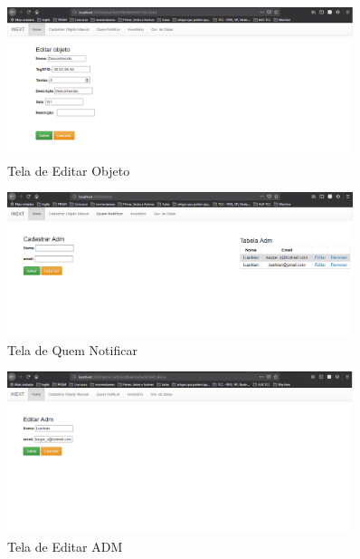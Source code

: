     \begin{figure}[H]
              \caption{\label{fig:tela_cadastro_manual}Tela de Editar Objeto}
              \centering
              \includegraphics[width=0.9\textwidth]{Figuras/tela_editar.png}
    \end{figure}
    
     \begin{figure}[H]
              \caption{\label{fig:tela_cadastro_manual}Tela de Quem Notificar}
              \centering
              \includegraphics[width=0.9\textwidth]{Figuras/tela_quem_notificar.PNG}
    \end{figure}
    
    \begin{figure}[H]
              \caption{\label{fig:tela_cadastro_manual}Tela de Editar ADM}
              \centering
              \includegraphics[width=0.9\textwidth]{Figuras/tela_editar_adm.png}
    \end{figure}
    
